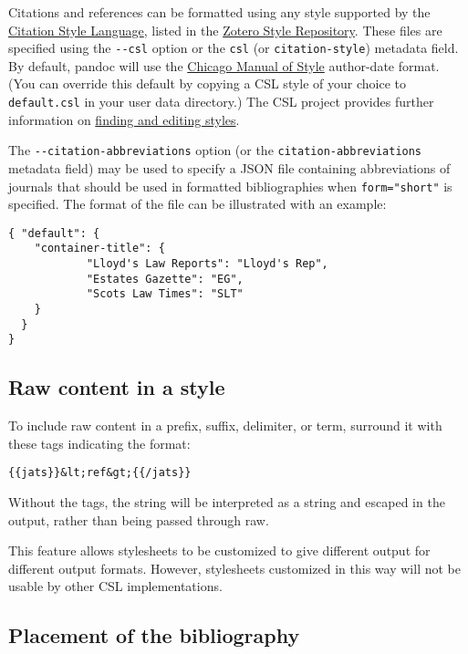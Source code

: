\documentclass[]{article}
\begin{document}
Citations and references can be formatted using any style supported by
the \href{https://citationstyles.org}{Citation Style Language}, listed
in the \href{https://www.zotero.org/styles}{Zotero Style Repository}.
These files are specified using the \texttt{-\/-csl} option or the
\texttt{csl} (or \texttt{citation-style}) metadata field. By default,
pandoc will use the \href{https://chicagomanualofstyle.org}{Chicago
Manual of Style} author-date format. (You can override this default by
copying a CSL style of your choice to \texttt{default.csl} in your user
data directory.) The CSL project provides further information on
\href{https://citationstyles.org/authors/}{finding and editing styles}.

The \texttt{-\/-citation-abbreviations} option (or the
\texttt{citation-abbreviations} metadata field) may be used to specify a
JSON file containing abbreviations of journals that should be used in
formatted bibliographies when \texttt{form="short"} is specified. The
format of the file can be illustrated with an example:

\begin{verbatim}
{ "default": {
    "container-title": {
            "Lloyd's Law Reports": "Lloyd's Rep",
            "Estates Gazette": "EG",
            "Scots Law Times": "SLT"
    }
  }
}
\end{verbatim}

\hypertarget{raw-content-in-a-style}{%
\subsection{Raw content in a style}\label{raw-content-in-a-style}}

To include raw content in a prefix, suffix, delimiter, or term, surround
it with these tags indicating the format:

\begin{verbatim}
{{jats}}&lt;ref&gt;{{/jats}}
\end{verbatim}

Without the tags, the string will be interpreted as a string and escaped
in the output, rather than being passed through raw.

This feature allows stylesheets to be customized to give different
output for different output formats. However, stylesheets customized in
this way will not be usable by other CSL implementations.

\hypertarget{placement-of-the-bibliography}{%
\subsection{Placement of the
bibliography}\label{placement-of-the-bibliography}}
\end{document}
